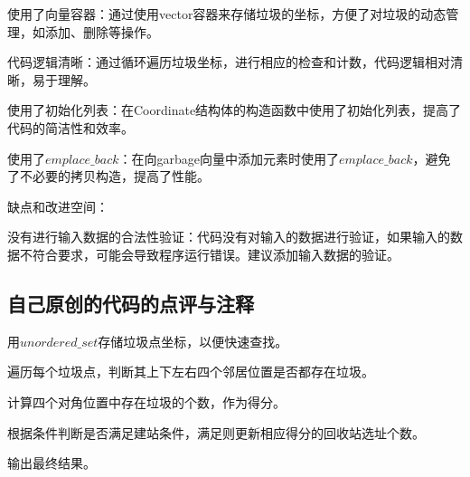 使用了向量容器：通过使用vector容器来存储垃圾的坐标，方便了对垃圾的动态管理，如添加、删除等操作。

代码逻辑清晰：通过循环遍历垃圾坐标，进行相应的检查和计数，代码逻辑相对清晰，易于理解。

使用了初始化列表：在Coordinate结构体的构造函数中使用了初始化列表，提高了代码的简洁性和效率。

使用了$emplace\_back$：在向garbage向量中添加元素时使用了$emplace\_back$，避免了不必要的拷贝构造，提高了性能。

缺点和改进空间：

没有进行输入数据的合法性验证：代码没有对输入的数据进行验证，如果输入的数据不符合要求，可能会导致程序运行错误。建议添加输入数据的验证。

\subsection{自己原创的代码的点评与注释}

用$unordered\_set$存储垃圾点坐标，以便快速查找。

遍历每个垃圾点，判断其上下左右四个邻居位置是否都存在垃圾。

计算四个对角位置中存在垃圾的个数，作为得分。

根据条件判断是否满足建站条件，满足则更新相应得分的回收站选址个数。

输出最终结果。

